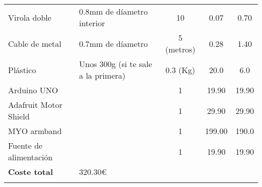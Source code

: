 \begin{landscape}
\begin{table}
\begin{tabular}{l l c c c}
 Virola doble               & 0.8mm de díametro interior & 10 & 0.07 & 0.70  \\
 Cable de metal             & 0.7mm de díametro & 5 (metros) &  0.28 & 1.40  \\
 Plástico                   & Unos 300g (si te sale a la primera) & 0.3 (Kg) & 20.0 & 6.0 \\
 Arduino UNO                & & 1 & 19.90 & 19.90   \\
 Adafruit Motor Shield      & & 1 & 29.90 & 29.90   \\
 MYO armband                & & 1 & 199.00 & 190.0 \\
 Fuente de alimentación     & & 1 & 19.90 & 19.90 \\
 \hline
 \textbf{Coste total}  & 320.30\euro  & & & \\
\bottomrule\\

\end{tabular}
\end{table}

\end{landscape}

